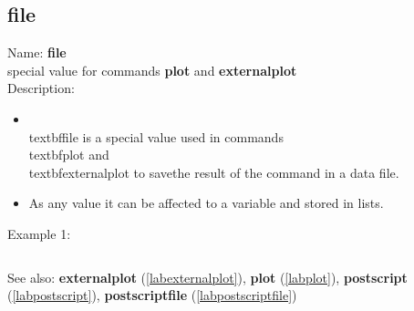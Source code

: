 \subsection{file}
\label{labfile}
\noindent Name: \textbf{file}\\
special value for commands \textbf{plot} and \textbf{externalplot}\\
\noindent Description: \begin{itemize}

\item \\textbf{file} is a special value used in commands \\textbf{plot} and \\textbf{externalplot} to save\n   the result of the command in a data file.\n
\item As any value it can be affected to a variable and stored in lists.\n\end{itemize}
\noindent Example 1: 
\begin{center}\begin{minipage}{15cm}\begin{Verbatim}[frame=single]
\end{Verbatim}
\end{minipage}\end{center}
See also: \textbf{externalplot} (\ref{labexternalplot}), \textbf{plot} (\ref{labplot}), \textbf{postscript} (\ref{labpostscript}), \textbf{postscriptfile} (\ref{labpostscriptfile})
